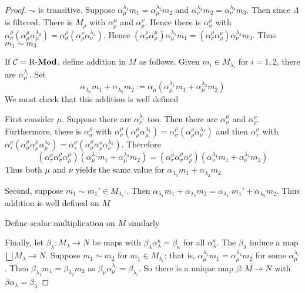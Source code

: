 \documentclass[11pt]{article}
\begin{document}
\begin{proof}
\(\sim\) is transitive. Suppose
\(\alpha_\mu^{\lambda_1}m_1=\alpha_\mu^{\lambda_2}m_2\) and
\(\alpha_\nu^{\lambda_2}m_2=\alpha_\nu^{\lambda_3}m_3\). Then since \(\Lambda\) is
filtered. There is \(M_\rho\) with \(\alpha^\mu_\rho\) and \(\alpha^\nu_\rho\). Hence
there is \(\alpha_\sigma^\rho\) with
\(\alpha_\sigma^\rho(\alpha_\rho^\mu\alpha_\mu^{\lambda_2})=\alpha_\sigma^\rho(\alpha^\nu_\rho\alpha^{\lambda_2}_\nu)\).
Hence
\((\alpha_\sigma^\rho\alpha_\rho^\mu)\alpha_\mu^{\lambda_1}m_1=(\alpha_\sigma^\rho\alpha_\rho^\nu)\alpha_\nu^{\lambda_3}m_3\).
Thus \(m_1\sim m_3\)

If \(\mathcal{C}=\operatorname{R-\textbf{Mod}}\), define addition in \(M\) as follows. Given \(m_i\in
   M_{\lambda_i}\) for \(i=1,2\),  there are \(\alpha_\mu^{\lambda_i}\). Set
\begin{equation*}
\alpha_{\lambda_1}m_1+\alpha_{\lambda_2}m_2:=\alpha_\mu(\alpha_\mu^{\lambda_1}m_1+\alpha_\mu^{\lambda_2}m_2)
\end{equation*}
We must check that this addition is well defined

First consider \(\mu\). Suppose there are \(\alpha_\nu^{\lambda_i}\) too. Then
there are \(\alpha_\rho^\mu\) and \(\alpha_\rho^\nu\). Furthermore, there is
\(\alpha_\sigma^\rho\) with
\(\alpha_\sigma^\rho(\alpha_\rho^\mu\alpha_\mu^{\lambda_1})=\alpha_\sigma^\rho(\alpha_\rho^\nu\alpha_\nu^{\lambda_1})\)
and then \(\alpha_\tau^\sigma\) with
\(\alpha_\tau^\sigma(\alpha_\sigma^\rho\alpha_\rho^\mu\alpha_\mu^{\lambda_2})=\alpha_\tau^\sigma(\alpha_\sigma^\rho\alpha_\rho^\nu\alpha_\nu^{\lambda_2})\).
Therefore
\begin{equation*}
 (\alpha_\tau^\sigma\alpha_\sigma^\rho\alpha_\rho^\mu)(\alpha_\mu^{\lambda_1}m_1+\alpha_\mu^{\lambda_2}m_2)=(\alpha_\tau^\sigma\alpha_\sigma^\rho\alpha_\rho^\nu)(\alpha_\nu^{\lambda_1}m_1+\alpha_\nu^{\lambda_2}m_2)
\end{equation*}
Thus both \(\mu\) and \(\nu\) yields the same value for
\(\alpha_{\lambda_1}m_1+\alpha_{\lambda_2}m_2\)

Second, suppose \(m_1\sim m_1'\in M_{\lambda_1'}\). Then
\(\alpha_{\lambda_1}m_1+\alpha_{\lambda_2}m_2=\alpha_{\lambda_1'}m_1'+\alpha_{\lambda_2}m_2\).
Thus addition is well defined on \(M\)

Define scalar multiplication on \(M\) similarly

Finally, let \(\beta_\lambda:M_\lambda\to N\) be maps with
\(\beta_\lambda\alpha^\kappa_\lambda=\beta_\kappa\) for all
\(\alpha_\lambda^\kappa\). The \(\beta_\lambda\) induce a map \(\bigsqcup
   M_\lambda\to N\). Suppose \(m_1\sim m_2\) for \(m_1\in M_{\lambda_i}\); that
is, \(\alpha_\mu^{\lambda_1}m_1=\alpha_\mu^{\lambda_2}m_2\) for some
\(\alpha_\mu^{\lambda_i}\). Then
\(\beta_{\lambda_1}m_1=\beta_{\lambda_2}m_2\) as
\(\beta_\mu\alpha_\mu^{\lambda_i}=\beta_{\lambda_i}\). So there is a unique
map \(\beta:M\to N\) with \(\beta\alpha_\lambda=\beta_\lambda\)
\end{proof}
\end{document}
